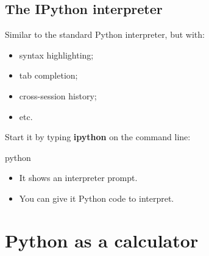 \documentclass[aspectratio=1610,slidestop]{beamer}
\begin{document}
\subsection{The IPython interpreter}
\begin{pframe}
  Similar to the standard Python interpreter, but with:
  \begin{itemize}
    \item syntax highlighting;
    \item tab completion;
    \item cross-session history;
    \item etc.
  \end{itemize}

  Start it by typing \textbf{ipython} on the command line:
  \begin{terminal}
  \color{white}{
  \begin{lstlisting}[frame=,style=,numbers=none]
$ ipython
Python 3.7 (default, Nov 12 2018, 13:43:14)
Type 'copyright', 'credits' or 'license' for more information
IPython 6.1.0 -- An enhanced Interactive Python. Type '?' for help.
  \end{lstlisting}}
  \begin{pythonin}{python}
  \end{pythonin}
  \addtocounter{cntr}{-1}
 \end{terminal}
 \begin{itemize}
  \item It shows an interpreter prompt.
  \item You can give it Python code to interpret.
 \end{itemize}
\end{pframe}

\section{Python as a calculator}
\end{document}
